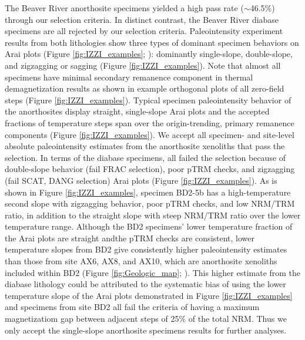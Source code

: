 \documentclass[9pt,twocolumn,twoside,lineno]{pnas-new}
\begin{document}
The Beaver River anorthosite specimens yielded a high pass rate ($\sim$46.5\%) through our selection criteria. In distinct contrast, the Beaver River diabase specimens are all rejected by our selection criteria. Paleointensity experiment results from both lithologies show three types of dominant specimen behaviors on Arai plots (Figure \ref{fig:IZZI_examples}; ): dominantly single-slope, double-slope, and zigzagging or sagging (Figure \ref{fig:IZZI_examples}). Note that almost all specimens have minimal secondary remanence component in thermal demagnetization results as shown in example orthogonal plots of all zero-field steps (Figure \ref{fig:IZZI_examples}). Typical specimen paleointensity behavior of the anorthosites display straight, single-slope Arai plots and the accepted fractions of temperature steps span over the origin-trending, primary remanence components (Figure \ref{fig:IZZI_examples}). We accept all specimen- and site-level absolute paleointensity estimates from the anorthosite xenoliths that pass the selection. In terms of the diabase specimens, all failed the selection because of double-slope behavior (fail FRAC selection), poor pTRM checks, and zigzagging (fail SCAT, DANG selection) Arai plots (Figure \ref{fig:IZZI_examples}). As is shown in Figure \ref{fig:IZZI_examples}, specimen BD2-5b has a high-temperature second slope with zigzagging behavior, poor pTRM checks, and low NRM/TRM ratio, in addition to the straight slope with steep NRM/TRM ratio over the lower temperature range. Although the BD2 specimens' lower temperature fraction of the Arai plots are straight andthe pTRM checks are consistent, lower temperature slopes from BD2 give consistently higher paleointensity estimates than those from site AX6, AX8, and AX10, which are anorthosite xenoliths included within BD2 (Figure \ref{fig:Geologic_map}; ). This higher estimate from the diabase lithology could be attributed to the systematic bias of using the lower temperature slope of the Arai plots demonstrated in Figure \ref{fig:IZZI_examples} and specimens from site BD2 all fail the criteria of having a maximum magnetizatiom gap between adjacent steps of 25\% of the total NRM. Thus we only accept the single-slope anorthosite specimens results for further analyses. 

\end{document}
